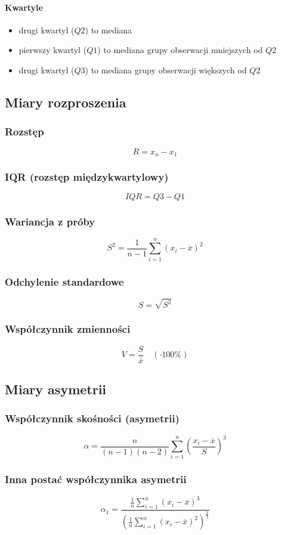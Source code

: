 \documentclass{article}
\theoremstyle{break}
\begin{document}
\paragraph{Kwartyle}
\begin{itemize}
	\item drugi kwartyl ($Q2$) to mediana
	\item pierwszy kwartyl ($Q1$) to mediana grupy obserwacji mniejszych od $Q2$
	\item drugi kwartyl ($Q3$) to mediana grupy obserwacji większych od $Q2$
\end{itemize}

\subsection{Miary rozproszenia}
\subsubsection{Rozstęp}
$$R=x_n-x_1$$
\subsubsection{IQR (rozstęp międzykwartylowy)}
$$IQR=Q3-Q1$$
\subsubsection{Wariancja z próby}
$$S^2=\frac{1}{n-1}\sum\limits_{i=1}^{n}(x_i - \overline{x})^2$$
\subsubsection{Odchylenie standardowe}
$$S=\sqrt{S^2}$$
\subsubsection{Współczynnik zmienności}
$$V=\frac{S}{\overline{x}} \quad (\cdot 100\%)$$

\subsection{Miary asymetrii}
\subsubsection{Współczynnik skośności (asymetrii)}
$$\alpha =\frac{n}{(n-1)(n-2)}\sum\limits_{i=1}^{n}(\frac{x_i-\overline{x}}{S})^3$$
\subsubsection{Inna postać współczynnika asymetrii}
$$\alpha_1 =\frac{\frac{1}{n}\sum\limits_{i=1}^{n}(x_i-\overline{x})^3}{(\frac{1}{n}\sum\limits_{i=1}^{n}(x_i-\overline{x})^2)^{\frac{3}{2}}}$$
\end{document}
